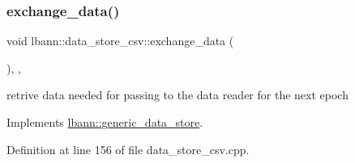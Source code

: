 \subsubsection{\texorpdfstring{exchange\+\_\+data()}{exchange\_data()}}
{\footnotesize\ttfamily void lbann\+::data\+\_\+store\+\_\+csv\+::exchange\+\_\+data (\begin{DoxyParamCaption}{ }\end{DoxyParamCaption})\hspace{0.3cm}{\ttfamily [override]}, {\ttfamily [protected]}, {\ttfamily [virtual]}}



retrive data needed for passing to the data reader for the next epoch 



Implements \hyperlink{classlbann_1_1generic__data__store_a5a34663fbbc3714d45743a6ca7195f51}{lbann\+::generic\+\_\+data\+\_\+store}.



Definition at line 156 of file data\+\_\+store\+\_\+csv.\+cpp.


